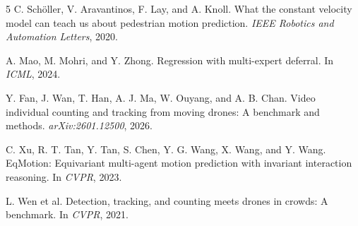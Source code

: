\documentclass[10pt,twocolumn,letterpaper]{article}
\begin{document}
\begin{thebibliography}{5}
C. Sch\"oller, V. Aravantinos, F. Lay, and A. Knoll.
What the constant velocity model can teach us about pedestrian
motion prediction. \emph{IEEE Robotics and Automation Letters}, 2020.

A. Mao, M. Mohri, and Y. Zhong.
Regression with multi-expert deferral. In \emph{ICML}, 2024.

Y. Fan, J. Wan, T. Han, A. J. Ma, W. Ouyang, and A. B. Chan.
Video individual counting and tracking from moving drones:
A benchmark and methods. \emph{arXiv:2601.12500}, 2026.

C. Xu, R. T. Tan, Y. Tan, S. Chen, Y. G. Wang, X. Wang, and Y. Wang.
EqMotion: Equivariant multi-agent motion prediction with invariant
interaction reasoning. In \emph{CVPR}, 2023.

L. Wen et al. Detection, tracking, and counting meets drones in
crowds: A benchmark. In \emph{CVPR}, 2021.
\end{thebibliography}
\end{document}

